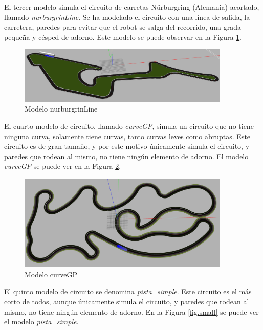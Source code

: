 El tercer modelo simula el circuito de carretas Nürburgring (Alemania) acortado, llamado \textit{nurburgrinLine}. Se ha modelado el circuito con una línea de salida, la carretera, paredes para evitar que el robot se salga del recorrido, una grada pequeña y césped de adorno. Este modelo se puede observar en la Figura \ref{fig.nurburgrin}.\\

\begin{figure}
  \begin{center}
    \includegraphics[width=0.9\textwidth]{figures/Infraestructura/circuit_Nurburgrin.png}
		\caption{Modelo nurburgrinLine}
		\label{fig.nurburgrin}
		\end{center}
\end{figure}

El cuarto modelo de circuito, llamado \textit{curveGP}, simula un circuito que no tiene ninguna curva, solamente tiene curvas, tanto curvas leves como abruptas. Este circuito es de gran tamaño, y por este motivo únicamente simula el circuito, y paredes que rodean al mismo, no tiene ningún elemento de adorno. El modelo \textit{curveGP} se puede ver en la Figura \ref{fig.curveGP}.\\


\begin{figure}
  \begin{center}
    \includegraphics[width=0.9\textwidth]{figures/Infraestructura/circuit_CurveGP.png}
		\caption{Modelo curveGP}
		\label{fig.curveGP}
		\end{center}
\end{figure}


El quinto modelo de circuito se denomina \textit{ pista\_simple}. Este circuito es el más corto de todos, aunque únicamente simula el circuito, y paredes que rodean al mismo, no tiene ningún elemento de adorno. En la Figura \ref{fig.small} se puede ver el modelo \textit{pista\_simple}.\\


